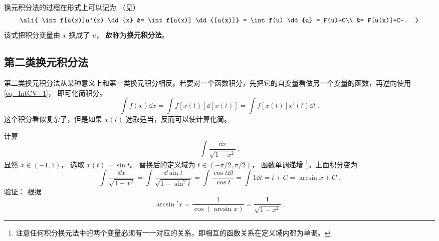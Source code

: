 换元积分法的过程在形式上可以记为 （见）
\begin{equation}\label{eq_IntCV_1}
\ali{
\int f[u(x)]u'(x) \dd{x} &= \int f[u(x)] \dd{[u(x)]} = \int f(u) \dd{u} = F(u)+C\\
&= F[u(x)]+C~.
}\end{equation}
该式把积分变量由 $x$ 换成了 $u$， 故称为\textbf{换元积分法}。

\subsection{第二类换元积分法}
第二类换元积分法从某种意义上和第一类换元积分相反。若要对一个函数积分，先把它的自变量看做另一个变量的函数，再逆向使用\autoref{eq_IntCV_1}， 即可化简积分。
\begin{equation}\label{eq_IntCV_6}
\int f(x) \dd{x} = \int f[x(t)] \dd{[x(t)]} = \int f[x(t)]x'(t) \dd{t}~.
\end{equation}
这个积分看似复杂了，但是如果 $x(t)$ 选取适当，反而可以使计算化简。

\begin{example}{}
计算
\begin{equation}
\int \frac{\dd{x}}{\sqrt{1-x^2}}~.
\end{equation}
显然 $x \in ( - 1,1)$， 选取 $x(t)=\sin t$。 替换后的定义域为 $t \in ( -\pi/2,\pi/2)$， 函数单调递增 \footnote{注意任何积分换元法中的两个变量必须有一一对应的关系，即相互的函数关系在定义域内都为单调。}。上面积分变为
\begin{equation}
\int \frac{\dd{x}}{\sqrt{1-x^2}}  = \int \frac{\dd{\sin t}}{\sqrt{1-\sin^2 t}} = \int \frac{\cos t\dd{t}}{\cos t}  = \int 1\dd{t}  = t + C = \arcsin x + C~.
\end{equation}
验证： 根据
\begin{equation}
\arcsin'x = \frac{1}{\cos(\arcsin x)} = \frac{1}{\sqrt {1 - {x^2}} }~.
\end{equation}
\end{example}




